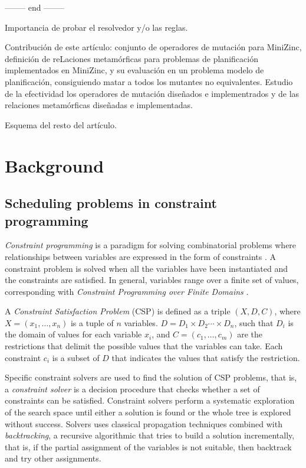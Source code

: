 -------- end --------



Importancia de probar el resolvedor y/o las reglas.

Contribución de este artículo: conjunto de operadores de mutación para MiniZinc, definición de reLaciones metamórficas para problemas de planificación implementados en MiniZinc, y su evaluación en un problema modelo de planificación, consiguiendo matar a todos los mutantes no equivalentes. Estudio de la efectividad los operadores de mutación diseñados e implementrados y de las relaciones metamórficas diseñadas e implementadas.

Esquema del resto del artículo.

\section{Background}



\subsection{Scheduling problems in constraint programming}

\textit{Constraint programming} is a paradigm for solving combinatorial problems where relationships between variables are expressed in the form of constraints \citep{rbw06}.
A constraint problem is solved when all the variables have been instantiated and the constraints are satisfied. In general, variables range over a finite set of values, corresponding with \textit{Constraint Programming over Finite Domains} \cite{schulte2006finite}.


\begin{definition}
  A \textit{Constraint Satisfaction Problem}
  \citep{guns2017miningzinc} (CSP) is defined as a triple
  $( X, D, C)$, where $X=(x_{1},\dots ,x_{n})$ is a tuple of $n$
  variables.  $D=D_{1}\times D_{2}\cdots \times D_{n}$, such that
  $D_i$ is the domain of values for each variable $x_i$, and
  $C=(c_{1},\dots ,c_{m})$ are the restrictions that delimit the
  possible values that the variables can take.  Each constraint
  $c_{i}$ is a subset of $D$ that indicates the values that satisfy
  the restriction.
\end{definition}



Specific constraint solvers are used to find the solution of CSP problems, that is, a \textit{constraint solver} is a decision procedure that checks whether a set of constraints can be satisfied.
Constraint solvers perform a systematic exploration of the search space until either a solution is found or the whole tree is explored without success.
Solvers uses classical propagation techniques \citep{van89} combined with {\em backtracking},
a recursive algorithmic that tries to build a solution incrementally, that is, if the partial assignment of the variables is not suitable, then backtrack and try other assignments.


